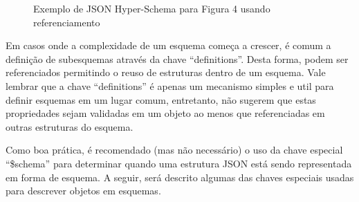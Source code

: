 \begin{figure}[H]
  \centering
  \inputminted[frame=single,framesep=10pt]{javascript}{anexos/pessoa-hyper-schema-\$ref.json}
  \caption{Exemplo de JSON Hyper-Schema para Figura 4 usando referenciamento}
\end{figure}

Em casos onde a complexidade de um esquema começa a crescer, é comum a definição de subesquemas através da chave “definitions”. Desta forma, podem ser referenciados permitindo o reuso de estruturas dentro de um esquema. Vale lembrar que a chave “definitions” é apenas um mecanismo simples e util para definir esquemas em um lugar comum, entretanto, não sugerem que estas propriedades sejam validadas em um objeto ao menos que referenciadas em outras estruturas do esquema. \cite{Leach2014}

Como boa prática, é recomendado (mas não necessário) o uso da chave especial “\$schema” para determinar quando uma estrutura JSON está sendo representada em forma de esquema. A seguir, será descrito algumas das chaves especiais usadas para descrever objetos em esquemas. \cite{Droettboom2015}

\begin{table}[ht!]
  \centering
  \caption{Subconjunto de chaves especiais JSON Schema}
\end{table}

